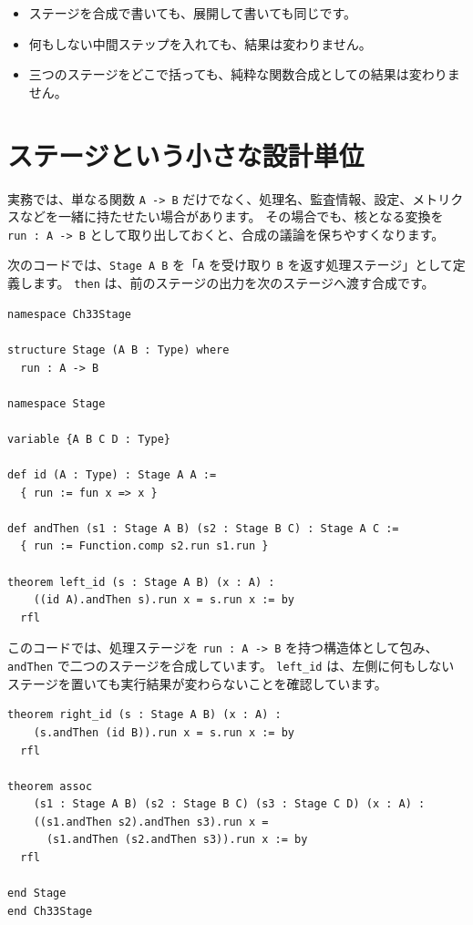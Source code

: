\begin{itemize}
\item ステージを合成で書いても、展開して書いても同じです。
\item 何もしない中間ステップを入れても、結果は変わりません。
\item 三つのステージをどこで括っても、純粋な関数合成としての結果は変わりません。
\end{itemize}

\section{ステージという小さな設計単位}

実務では、単なる関数 \texttt{A -> B} だけでなく、処理名、監査情報、設定、メトリクスなどを一緒に持たせたい場合があります。
その場合でも、核となる変換を \texttt{run : A -> B} として取り出しておくと、合成の議論を保ちやすくなります。

次のコードでは、\texttt{Stage A B} を「\texttt{A} を受け取り \texttt{B} を返す処理ステージ」として定義します。
\texttt{then} は、前のステージの出力を次のステージへ渡す合成です。

\begin{listing}[htbp]
\begin{verbatim}
namespace Ch33Stage

structure Stage (A B : Type) where
  run : A -> B

namespace Stage

variable {A B C D : Type}

def id (A : Type) : Stage A A :=
  { run := fun x => x }

def andThen (s1 : Stage A B) (s2 : Stage B C) : Stage A C :=
  { run := Function.comp s2.run s1.run }

theorem left_id (s : Stage A B) (x : A) :
    ((id A).andThen s).run x = s.run x := by
  rfl
\end{verbatim}
\caption{\texttt{Stage.id}・\texttt{Stage.andThen}・\texttt{Stage.left\_id}}
\label{lst:ch33-stage}
\end{listing}

このコードでは、処理ステージを \texttt{run : A -> B} を持つ構造体として包み、\texttt{andThen} で二つのステージを合成しています。
\texttt{left\_id} は、左側に何もしないステージを置いても実行結果が変わらないことを確認しています。

\begin{listing}[htbp]
\begin{verbatim}
theorem right_id (s : Stage A B) (x : A) :
    (s.andThen (id B)).run x = s.run x := by
  rfl

theorem assoc
    (s1 : Stage A B) (s2 : Stage B C) (s3 : Stage C D) (x : A) :
    ((s1.andThen s2).andThen s3).run x =
      (s1.andThen (s2.andThen s3)).run x := by
  rfl

end Stage
end Ch33Stage
\end{verbatim}
\caption{\texttt{Stage.right\_id}・\texttt{Stage.assoc}}
\label{lst:ch33-stage-laws}
\end{listing}

